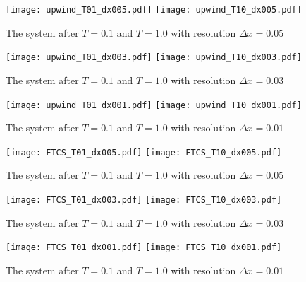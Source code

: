 

\begin{figure}[h]
    \centering
    \texttt{[image: upwind\_T01\_dx005.pdf]}
    \hspace{0.05pt}
    \texttt{[image: upwind\_T10\_dx005.pdf]}
    \caption{The system after $T=0.1$ and $T=1.0$ with resolution $\Delta x=0.05$}
    \label{fig:upwind_dx005}
\end{figure}

\begin{figure}[h]
    \centering
    \texttt{[image: upwind\_T01\_dx003.pdf]}
    \hspace{0.05pt}
    \texttt{[image: upwind\_T10\_dx003.pdf]}
    \caption{The system after $T=0.1$ and $T=1.0$ with resolution $\Delta x=0.03$}
    \label{fig:upwind_dx003}
\end{figure}

\begin{figure}[h]
    \centering
    \texttt{[image: upwind\_T01\_dx001.pdf]}
    \hspace{0.05pt}
    \texttt{[image: upwind\_T10\_dx001.pdf]}
    \caption{The system after $T=0.1$ and $T=1.0$ with resolution $\Delta x=0.01$}
    \label{fig:upwind_dx001}
\end{figure}

\begin{figure}[h]
    \centering
    \texttt{[image: FTCS\_T01\_dx005.pdf]}
    \hspace{0.05pt}
    \texttt{[image: FTCS\_T10\_dx005.pdf]}
    \caption{The system after $T=0.1$ and $T=1.0$ with resolution $\Delta x=0.05$}
    \label{fig:FTCS_dx005}
\end{figure}

\begin{figure}[h]
    \centering
    \texttt{[image: FTCS\_T01\_dx003.pdf]}
    \hspace{0.05pt}
    \texttt{[image: FTCS\_T10\_dx003.pdf]}
    \caption{The system after $T=0.1$ and $T=1.0$ with resolution $\Delta x=0.03$}
    \label{fig:FTCS_dx003}
\end{figure}

\begin{figure}[h]
    \centering
    \texttt{[image: FTCS\_T01\_dx001.pdf]}
    \hspace{0.05pt}
    \texttt{[image: FTCS\_T10\_dx001.pdf]}
    \caption{The system after $T=0.1$ and $T=1.0$ with resolution $\Delta x=0.01$}
    \label{fig:FTCS_dx001}
\end{figure}

